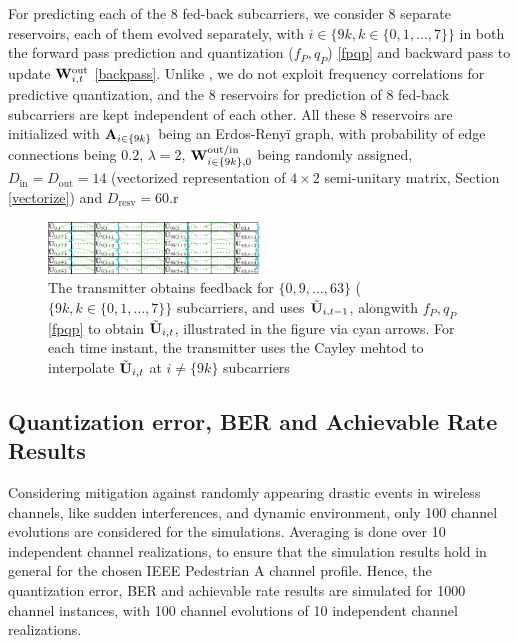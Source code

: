 \documentclass[conference]{IEEEtran}
\begin{document}
For predicting each of the $8$ fed-back subcarriers, we consider $8$ separate reservoirs, each of them evolved separately, with $i\in\{9k, k \in \{0,1,\ldots,7\}\}$ in both the forward pass prediction and quantization ($f_P,q_P$) \eqref{fpqp} and backward pass to update ${\bf W}_{i,t}^{\text{out}}$ \eqref{backpass}. Unlike \cite{Gupt1905:Predictive}, we do not exploit frequency correlations for predictive quantization, and the $8$ reservoirs for prediction of $8$ fed-back subcarriers are kept independent of each other. All these 8 reservoirs are initialized with ${\bf A}_{i\in\{9k\}}$ being an Erdos-Reny\"i graph, with probability of edge connections being $0.2$, $\lambda=2$, ${\bf W}^{\text{out/in}}_{i\in\{9k\},0}$ being randomly assigned, $D_{\text{in}}=D_{\text{out}}=14$ (vectorized representation of $4\times2$ semi-unitary matrix, Section \ref{vectorize}) and $D_{\text{resv}}=60$.r

\begin{figure}
\centering
\includegraphics[width=0.5\textwidth]{images/table.pdf}
\caption{The transmitter obtains feedback for $\{0,9,\ldots,63\}$ ($\{9k, k \in \{0,1,\ldots,7\}\}$ subcarriers, and uses $\tilde{{\bf U}}_{i,t-1}$, alongwith $f_P,q_P$ \eqref{fpqp} to obtain $\tilde{{\bf U}}_{i,t}$, illustrated in the figure via cyan arrows. For each time instant, the transmitter uses the Cayley mehtod to interpolate $\tilde{{\bf U}}_{i,t}$ at $i\neq\{9k\}$ subcarriers}
\label{table}
\end{figure}

\subsection{Quantization error, BER and Achievable Rate Results}
\label{res}{}
Considering mitigation against randomly appearing drastic events in wireless channels, like sudden interferences, and dynamic environment, only 100 channel evolutions are considered for the simulations. Averaging is done over 10 independent channel realizations, to ensure that the simulation results hold in general for the chosen IEEE Pedestrian A channel profile. Hence, the quantization error, BER and achievable rate results are simulated for 1000 channel instances, with 100 channel evolutions of 10 independent channel realizations.
\end{document}
